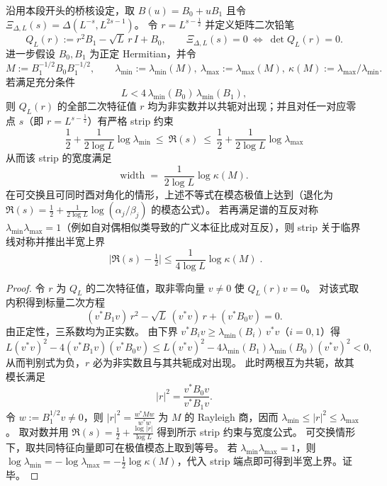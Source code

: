 \begin{theorem}\label{thm:xi-qep-noncommuting-cond-bound}
沿用本段开头的桥核设定，取 \(B(u)=B_0+uB_1\) 且令 \(\Xi_{\Delta,L}(s)=\Delta(L^{-s},L^{2s-1})\)。
令 \(r=L^{s-\frac12}\) 并定义矩阵二次铅笔
\[
Q_L(r):=r^2B_1-\sqrt L\,r\,I+B_0,
\qquad
\Xi_{\Delta,L}(s)=0\ \Longleftrightarrow\ \det Q_L(r)=0.
\]
进一步假设 \(B_0,B_1\) 为正定 Hermitian，并令
\[
M:=B_1^{-1/2}B_0B_1^{-1/2},
\qquad
\lambda_{\min}:=\lambda_{\min}(M),\ \lambda_{\max}:=\lambda_{\max}(M),\ 
\kappa(M):=\lambda_{\max}/\lambda_{\min}.
\]
若满足充分条件
\[
L<4\,\lambda_{\min}(B_0)\,\lambda_{\min}(B_1),
\]
则 \(Q_L(r)\) 的全部二次特征值 \(r\) 均为非实数并以共轭对出现；并且对任一对应零点 \(s\)（即 \(r=L^{s-\frac12}\)）有严格 strip 约束
\[
\boxed{\;
\frac12+\frac{1}{2\log L}\log\lambda_{\min}
\ \le\ 
\Re(s)
\ \le\
\frac12+\frac{1}{2\log L}\log\lambda_{\max}\;}
\]
从而该 strip 的宽度满足
\[
\mathrm{width}
\;=\;
\frac{1}{2\log L}\log\kappa(M).
\]
在可交换且可同时酉对角化的情形，上述不等式在模态极值上达到（退化为 \(\Re(s)=\frac12+\frac{1}{2\log L}\log(\alpha_j/\beta_j)\) 的模态公式）。
若再满足谱的互反对称 \(\lambda_{\min}\lambda_{\max}=1\)（例如自对偶相似类导致的广义本征比成对互反），则 strip 关于临界线对称并推出半宽上界
\[
\boxed{\;
\bigl|\Re(s)-\tfrac12\bigr|
\le
\frac{1}{4\log L}\log\kappa(M)\; }.
\]
\end{theorem}

\begin{proof}
令 \(r\) 为 \(Q_L\) 的二次特征值，取非零向量 \(v\neq 0\) 使 \(Q_L(r)v=0\)。
对该式取内积得到标量二次方程
\[
(v^\ast B_1v)\,r^2-\sqrt L\,(v^\ast v)\,r+(v^\ast B_0v)=0.
\]
由正定性，三系数均为正实数。
由下界 \(v^\ast B_i v\ge \lambda_{\min}(B_i)\,v^\ast v\)（\(i=0,1\)）得
\[
L(v^\ast v)^2-4(v^\ast B_1v)(v^\ast B_0v)
\le
L(v^\ast v)^2-4\lambda_{\min}(B_1)\lambda_{\min}(B_0)(v^\ast v)^2<0,
\]
从而判别式为负，\(r\) 必为非实数且与其共轭成对出现。
此时两根互为共轭，故其模长满足
\[
|r|^2=\frac{v^\ast B_0v}{v^\ast B_1v}.
\]
令 \(w:=B_1^{1/2}v\neq 0\)，则
\(
|r|^2=\frac{w^\ast Mw}{w^\ast w}
\)
为 \(M\) 的 Rayleigh 商，因而
\(
\lambda_{\min}\le |r|^2\le \lambda_{\max}
\)。
取对数并用 \(\Re(s)=\tfrac12+\frac{\log|r|}{\log L}\) 得到所示 strip 约束与宽度公式。
可交换情形下，取共同特征向量即可在极值模态上取到等号。
若 \(\lambda_{\min}\lambda_{\max}=1\)，则 \(\log\lambda_{\min}=-\log\lambda_{\max}=-\frac12\log\kappa(M)\)，代入 strip 端点即可得到半宽上界。证毕。
\end{proof}

